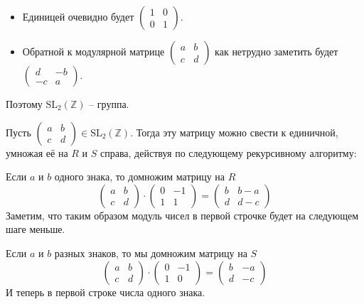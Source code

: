 \documentclass{article}
\begin{document}
\begin{enumerate}
\begin{itemize}
            \item Единицей очевидно будет $\left(\begin{array}{cc}1 & 0\\0 & 1
                \end{array}\right)$.
            \item Обратной к модулярной матрице $\left(\begin{array}{cc}a & b\\
                    c & d\end{array}\right)$ как нетрудно заметить будет
                    $\left(\begin{array}{cc}d & -b\\-c & a\end{array}\right)$.
        \end{itemize}
        Поэтому $\text{SL}_2(\mathbb{Z})$ – группа.

        Пусть $\left(\begin{array}{cc}a & b\\ c & d\end{array}\right)\in
        \text{SL}_2(\mathbb{Z})$. Тогда эту матрицу можно свести к единичной,
        умножая её на $R$ и $S$ справа, действуя по следующему рекурсивному
        алгоритму:

        Если $a$ и $b$ одного знака, то домножим матрицу на $R$
        \[\left(\begin{array}{cc}a & b\\c & d\end{array}\right)\cdot
          \left(\begin{array}{cc}0 & -1\\1 & 1\end{array}\right)=
          \left(\begin{array}{cc}b & b-a\\d & d-c\end{array}\right)\]
        Заметим, что таким образом модуль чисел в первой строчке будет на
        следующем шаге меньше.

        Если $a$ и $b$ разных знаков, то мы домножим матрицу на $S$
        \[\left(\begin{array}{cc}a & b\\c & d\end{array}\right)\cdot
          \left(\begin{array}{cc}0 & -1\\1 & 0\end{array}\right)=
          \left(\begin{array}{cc}b & -a\\d & -c\end{array}\right)\]
        И теперь в первой строке числа одного знака.


\end{enumerate}
\end{document}
